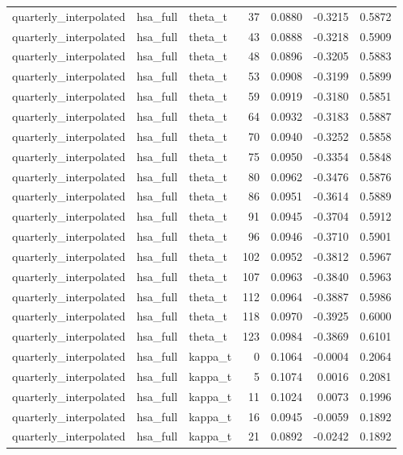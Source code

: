 \begin{tabular}{lllrrrr}
quarterly\_interpolated & hsa\_full & theta\_t & 37 & 0.0880 & -0.3215 & 0.5872 \\
quarterly\_interpolated & hsa\_full & theta\_t & 43 & 0.0888 & -0.3218 & 0.5909 \\
quarterly\_interpolated & hsa\_full & theta\_t & 48 & 0.0896 & -0.3205 & 0.5883 \\
quarterly\_interpolated & hsa\_full & theta\_t & 53 & 0.0908 & -0.3199 & 0.5899 \\
quarterly\_interpolated & hsa\_full & theta\_t & 59 & 0.0919 & -0.3180 & 0.5851 \\
quarterly\_interpolated & hsa\_full & theta\_t & 64 & 0.0932 & -0.3183 & 0.5887 \\
quarterly\_interpolated & hsa\_full & theta\_t & 70 & 0.0940 & -0.3252 & 0.5858 \\
quarterly\_interpolated & hsa\_full & theta\_t & 75 & 0.0950 & -0.3354 & 0.5848 \\
quarterly\_interpolated & hsa\_full & theta\_t & 80 & 0.0962 & -0.3476 & 0.5876 \\
quarterly\_interpolated & hsa\_full & theta\_t & 86 & 0.0951 & -0.3614 & 0.5889 \\
quarterly\_interpolated & hsa\_full & theta\_t & 91 & 0.0945 & -0.3704 & 0.5912 \\
quarterly\_interpolated & hsa\_full & theta\_t & 96 & 0.0946 & -0.3710 & 0.5901 \\
quarterly\_interpolated & hsa\_full & theta\_t & 102 & 0.0952 & -0.3812 & 0.5967 \\
quarterly\_interpolated & hsa\_full & theta\_t & 107 & 0.0963 & -0.3840 & 0.5963 \\
quarterly\_interpolated & hsa\_full & theta\_t & 112 & 0.0964 & -0.3887 & 0.5986 \\
quarterly\_interpolated & hsa\_full & theta\_t & 118 & 0.0970 & -0.3925 & 0.6000 \\
quarterly\_interpolated & hsa\_full & theta\_t & 123 & 0.0984 & -0.3869 & 0.6101 \\
quarterly\_interpolated & hsa\_full & kappa\_t & 0 & 0.1064 & -0.0004 & 0.2064 \\
quarterly\_interpolated & hsa\_full & kappa\_t & 5 & 0.1074 & 0.0016 & 0.2081 \\
quarterly\_interpolated & hsa\_full & kappa\_t & 11 & 0.1024 & 0.0073 & 0.1996 \\
quarterly\_interpolated & hsa\_full & kappa\_t & 16 & 0.0945 & -0.0059 & 0.1892 \\
quarterly\_interpolated & hsa\_full & kappa\_t & 21 & 0.0892 & -0.0242 & 0.1892 \\

\end{tabular}

